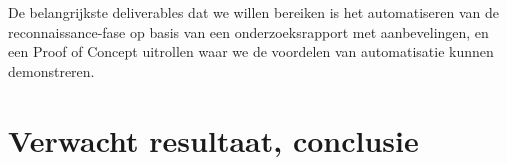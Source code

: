 De belangrijkste deliverables dat we willen bereiken is het automatiseren van de reconnaissance-fase op
basis van een onderzoeksrapport met aanbevelingen, en een Proof of Concept uitrollen waar we de voordelen
van automatisatie kunnen demonstreren.







\section{Verwacht resultaat, conclusie}%
\label{sec:verwachte_resultaten}


